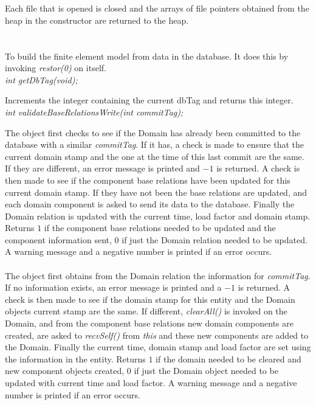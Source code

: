  \\
\\ 
Each file that is opened is closed and the arrays of file pointers
obtained from the heap in the constructor are returned to the heap. \\

  \\
\\ 
To build the finite element model from data in the database. It does
this by invoking {\em restor(0)} on itself. \\

{\em int getDbTag(void);}

Increments the integer containing the current dbTag and returns this
integer. \\

{\em int validateBaseRelationsWrite(int commitTag); }

The object first checks to see if the Domain has already been
committed to the database with a similar {\em commitTag}. If it has, a
check is made to ensure that the current domain stamp and the one at
the time of this last commit are the same. If they are different, an
error message is printed and $-1$ is returned. A check is then made to
see if the component base relations have been updated for this current domain
stamp. If they have not been the base relations are updated, and each
domain component is asked to send its data to the database. Finally
the Domain relation is updated with the current time, load factor and
domain stamp. Returns $1$ if the component base relations needed to be updated
and the component information sent, $0$ if just the Domain relation
needed to be updated. A warning message and a negative number is
printed if an error occurs. \\


\\ 
The object first obtains from the Domain relation the information for
{\em commitTag}. If no information exists, an error message is printed
and a $-1$ is returned. A check is then made to see if the domain
stamp for this entity and the Domain objects current stamp are the
same. If different, {\em clearAll()} is invoked on the Domain, and
from the component base relations new domain components are created,
are asked to {\em recvSelf()} from {\em *this} and these new
components are added to the Domain. Finally the current time, domain
stamp and load factor are set using the information in the entity. 
Returns $1$ if the domain needed to be cleared and new component
objects created, $0$ if just the Domain object needed to be updated
with current time and load factor. A warning message and a negative
number is printed if an error occurs. \\

